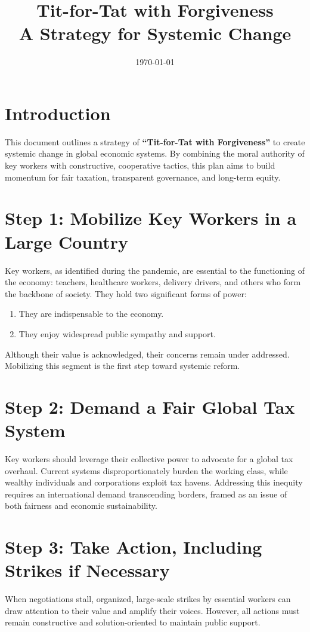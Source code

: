 \documentclass[11pt,a4paper]{article}
\title{\Huge Tit-for-Tat with Forgiveness\\[0.5em]\Large A Strategy for Systemic Change}
\author{}
\date{\today}
\begin{document}
\maketitle
\thispagestyle{empty}

\vfill


\clearpage
\tableofcontents
\clearpage

\section{Introduction}
This document outlines a strategy of \textbf{``Tit-for-Tat with Forgiveness''} to create systemic change in global economic systems. By combining the moral authority of key workers with constructive, cooperative tactics, this plan aims to build momentum for fair taxation, transparent governance, and long-term equity.

\section{Step 1: Mobilize Key Workers in a Large Country}
Key workers, as identified during the pandemic, are essential to the functioning of the economy: teachers, healthcare workers, delivery drivers, and others who form the backbone of society. They hold two significant forms of power:
\begin{enumerate}
  \item They are indispensable to the economy.
  \item They enjoy widespread public sympathy and support.
\end{enumerate}
Although their value is acknowledged, their concerns remain under addressed. Mobilizing this segment is the first step toward systemic reform.

\section{Step 2: Demand a Fair Global Tax System}
Key workers should leverage their collective power to advocate for a global tax overhaul. Current systems disproportionately burden the working class, while wealthy individuals and corporations exploit tax havens. Addressing this inequity requires an international demand transcending borders, framed as an issue of both fairness and economic sustainability.

\section{Step 3: Take Action, Including Strikes if Necessary}
When negotiations stall, organized, large-scale strikes by essential workers can draw attention to their value and amplify their voices. However, all actions must remain constructive and solution-oriented to maintain public support.
\end{document}
